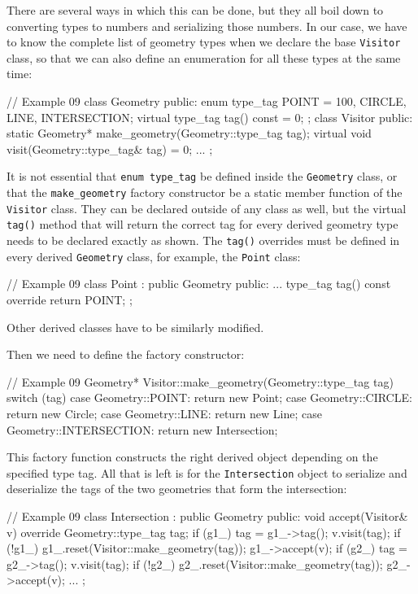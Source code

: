 There are several ways in which this can be done, but they all boil down to converting types to numbers and serializing those numbers. In our case, we have to know the complete list of geometry types when we declare the base \texttt{Visitor} class, so that we can also define an enumeration for all these types at the same time:

\begin{code}
// Example 09
class Geometry {
  public:
  enum type_tag {POINT = 100, CIRCLE, LINE, INTERSECTION};
  virtual type_tag tag() const = 0;
};
class Visitor {
  public:
  static Geometry* make_geometry(Geometry::type_tag tag);
  virtual void visit(Geometry::type_tag& tag) = 0;
  ...
};
\end{code}

It is not essential that \texttt{enum\ type\_tag} be defined inside the \texttt{Geometry} class, or that the \texttt{make\_geometry} factory constructor be a static member function of the \texttt{Visitor} class. They can be declared outside of any class as well, but the virtual \texttt{tag()} method that will return the correct tag for every derived geometry type needs to be declared exactly as shown. The \texttt{tag()} overrides must be defined in every derived \texttt{Geometry} class, for example, the \texttt{Point} class:

\begin{code}
// Example 09
class Point : public Geometry {
  public:
  ...
  type_tag tag() const override { return POINT; }
};
\end{code}

Other derived classes have to be similarly modified.

Then we need to define the factory constructor:

\begin{code}
// Example 09
Geometry* Visitor::make_geometry(Geometry::type_tag tag) {
  switch (tag) {
    case Geometry::POINT: return new Point;
    case Geometry::CIRCLE: return new Circle;
    case Geometry::LINE: return new Line;
    case Geometry::INTERSECTION: return new Intersection;
  }
}
\end{code}

This factory function constructs the right derived object depending on the specified type tag. All that is left is for the \texttt{Intersection} object to serialize and deserialize the tags of the two geometries that form the intersection:

\begin{code}
// Example 09
class Intersection : public Geometry {
  public:
  void accept(Visitor& v) override {
    Geometry::type_tag tag;
    if (g1_) tag = g1_->tag();
    v.visit(tag);
    if (!g1_) g1_.reset(Visitor::make_geometry(tag));
    g1_->accept(v);
    if (g2_) tag = g2_->tag();
    v.visit(tag);
    if (!g2_) g2_.reset(Visitor::make_geometry(tag));
    g2_->accept(v);
  }
  ...
};
\end{code}

